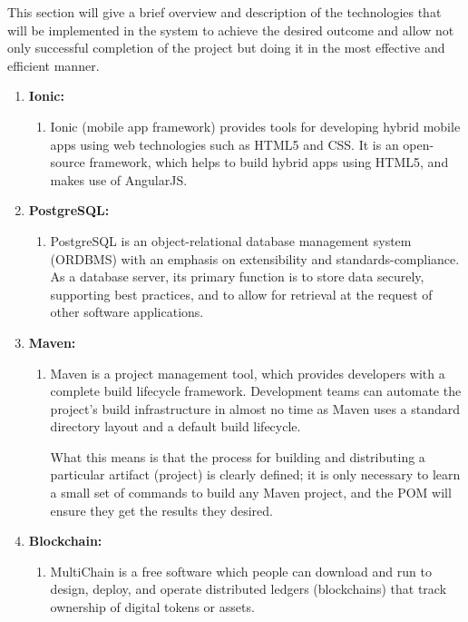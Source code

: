 This section will give a brief overview and description of the technologies that will be implemented in the system to achieve the desired outcome and allow not only successful completion of the project but doing it in the most effective and efficient manner.

	\begin{enumerate}
		\item \textbf{Ionic:} 
		\begin{enumerate}
			\item[] Ionic (mobile app framework) provides tools for developing hybrid mobile apps using web technologies such as HTML5 and CSS. It is an open-source framework, which helps to build hybrid apps using HTML5, and makes use of AngularJS. 
		\end{enumerate}
		
		\item \textbf{PostgreSQL:}
		\begin{enumerate}
			\item[] PostgreSQL is an object-relational database management system (ORDBMS) with an emphasis on extensibility and standards-compliance. As a database server, its primary function is to store data securely, supporting best practices, and to allow for retrieval at the request of other software applications. 
		\end{enumerate} 
		
		\item \textbf{Maven:}
		\begin{enumerate}
			\item[] Maven is a project management tool, which provides developers with a complete build lifecycle framework. Development teams can automate the project's build infrastructure in almost no time as Maven uses a standard directory layout and a default build lifecycle.
						
			What this means is that the process for building and distributing a particular artifact (project) is clearly defined; it is only necessary to learn a small set of commands to build any Maven project, and the POM will ensure they get the results they desired.
		\end{enumerate}
		
		\newpage
		
		\item \textbf{Blockchain:}	
		\begin{enumerate}
			\item[] MultiChain is a free software which people can download and run to design, deploy, and operate distributed ledgers (blockchains) that track ownership of digital tokens or assets.
		\end{enumerate}
	\end{enumerate}